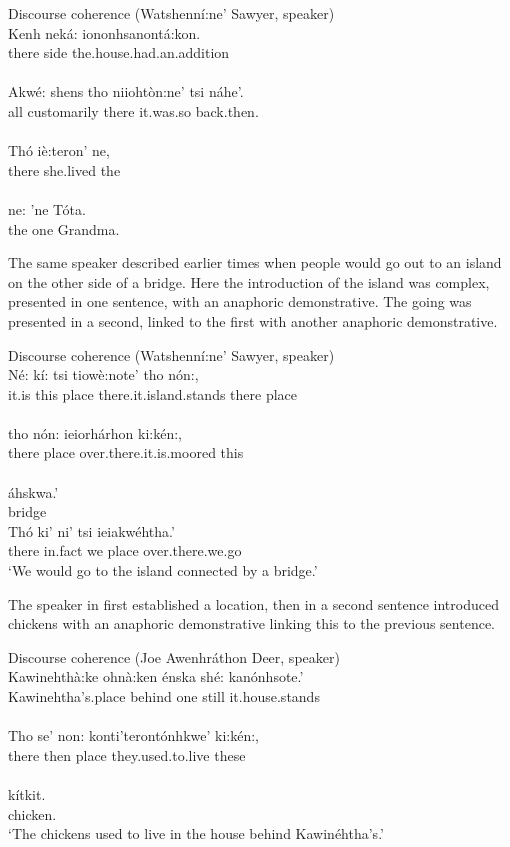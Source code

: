 \documentclass[output=paper,colorlinks,citecolor=brown]{langscibook}
\begin{document}
\ea Discourse coherence (Watshenní:ne' Sawyer, speaker)\\\label{ex:mithun:15}
\gll
Kenh neká: iononhsanontá:kon.\\
there side {the.house.had.an.addition}\\
\medskip\\
\gll Akwé: shens      tho    niiohtòn:ne' tsi náhe'.\\
     all customarily  there {it.was.so}  {back.then}.\\
\medskip\\
\gll Thó iè:teron'       ne,\\
     there  {she.lived}  the\\
\medskip\\
\gll ne: 'ne Tóta.\\
    the one Grandma.\\
\z

The same speaker described earlier times when people would go out to an island on the other side of a bridge. Here the introduction of the island was complex, presented in one sentence, with an anaphoric demonstrative. The going was presented in a second, linked to the first with another anaphoric demonstrative.

\ea Discourse coherence (Watshenní:ne' Sawyer, speaker)\\\label{ex:mithun:16}
\gll Né: kí: tsi tiowè:note' tho nón:,\\
     {it.is} this place {there.it.island.stands} there place\\
\medskip\\
\gll tho nón: ieiorhárhon ki:kén:,\\
     there place {over.there.it.is.moored} this\\
\medskip\\
áhskwa.'\\
bridge\medskip\\
\gll Thó  ki' ni' tsi  ieiakwéhtha.'\\
     there {in.fact}  we place {over.there.we.go}\\
\glt `We would go to the island connected by a bridge.'
\z


The speaker in  first established a location, then in a second sentence introduced chickens with an anaphoric demonstrative linking this to the previous sentence.

\ea Discourse coherence (Joe Awenhráthon Deer, speaker)\\\label{ex:mithun:17}
\gll Kawinehthà:ke ohnà:ken énska shé: kanónhsote.'\\
     {Kawinehtha's.place} behind  one  still {it.house.stands}\\
\medskip\\
\gll Tho se' non: konti'terontónhkwe' ki:kén:,\\
there  then  place {they.used.to.live} these  \\
\medskip\\
\gll  kítkit.\\
chicken.\\
\glt `The chickens used to live in the house behind Kawinéhtha's.'
\z
\end{document}

